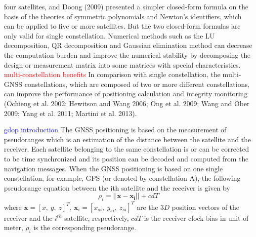 \documentclass[a4paper]{report}
\begin{document}
four satellites, and Doong (2009) presented a simpler
closed-form formula on the basis of the theories of symmetric
polynomials and Newton’s identifiers, which can be
applied to five or more satellites. But the two closed-form
formulas are only valid for single constellation. Numerical
methods such as the LU decomposition, QR decomposition
and Gaussian elimination method can decrease the computation
burden and improve the numerical stability by
decomposing the design or measurement matrix into some
matrices with special characteristics.\\
\textcolor{red}{multi-constellation benefits}
In comparison with single constellation, the multi-GNSS
constellations, which are composed of two or more different
constellations, can improve the performance of positioning
calculation and integrity monitoring (Ochieng
et al. 2002; Hewitson and Wang 2006; Ong et al. 2009;
Wang and Ober 2009; Yang et al. 2011; Martini et al.
2013).

\textcolor{blue}{gdop introduction}
 The GNSS positioning is based on the measurement
of pseudoranges which is an estimation of the
distance between the satellite and the receiver. Each
satellite belonging to the same constellation is or can be
corrected to be time synchronized and its position can be
decoded and computed from the navigation messages.
When the GNSS positioning is based on one single constellation,
for example, GPS (or denoted by constellation
A), the following pseudorange equation between the ith
satellite and the receiver is given by
\begin{equation}
\rho_i=||\mathbf{x}-\mathbf{x_i}||+cdT
\label{eqq:rho1}
\end{equation}
where $\mathbf{x}=[x,\ y,\ z]^T$, $\mathbf{x}_i=[x_{si},\ y_{si},\ z_{si}]^T$ are the $3D$ position vectors of the receiver and the $i^{th}$ satellite, respectively, $cdT$ is the receiver clock bias in unit of meter, $\rho_i$ is the corresponding pseudorange. 
\end{document}
